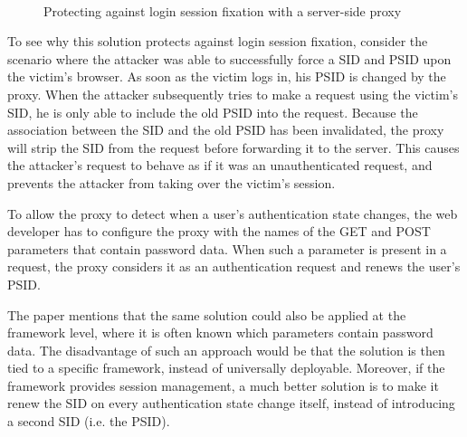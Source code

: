\begin{figure}[htb]
	\centering
	\\
	\caption[Protecting against login session fixation with a server-side proxy]{\label{fig:johnsfixation}Protecting against login session fixation with a server-side proxy \cite{Johns2011}}
\end{figure}

To see why this solution protects against login session fixation, consider the scenario where the attacker was able to successfully force a SID and PSID upon the victim's browser. As soon as the victim logs in, his PSID is changed by the proxy. When the attacker subsequently tries to make a request using the victim's SID, he is only able to include the old PSID into the request. Because the association between the SID and the old PSID has been invalidated, the proxy will strip the SID from the request before forwarding it to the server. This causes the attacker's request to behave as if it was an unauthenticated request, and prevents the attacker from taking over the victim's session.

To allow the proxy to detect when a user's authentication state changes, the web developer has to configure the proxy with the names of the GET and POST parameters that contain password data. When such a parameter is present in a request, the proxy considers it as an authentication request and renews the user's PSID.

The paper mentions that the same solution could also be applied at the framework level, where it is often known which parameters contain password data. The disadvantage of such an approach would be that the solution is then tied to a specific framework, instead of universally deployable. Moreover, if the framework provides session management, a much better solution is to make it renew the SID on every authentication state change itself, instead of introducing a second SID (i.e. the PSID).

